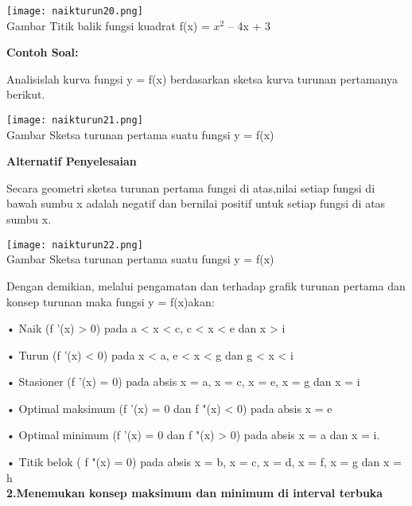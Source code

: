 \documentclass[11pt,fleqn]{book} %
\begin{document}
\begin{center}
\texttt{[image: naikturun20.png]}\\
Gambar Titik balik fungsi kuadrat f(x) = $x^{2}$ – 4x + 3
\end{center}

\begin{flushleft}
\textbf{Contoh Soal:}

Analisislah kurva fungsi y = f(x) berdasarkan sketsa kurva
turunan pertamanya berikut.
\end{flushleft}

\begin{center}
\texttt{[image: naikturun21.png]}\\
Gambar Sketsa turunan pertama suatu fungsi y = f(x)
\end{center}

\begin{flushleft}
\textbf{Alternatif Penyelesaian}

Secara geometri sketsa turunan pertama fungsi di atas,nilai setiap fungsi di bawah sumbu x adalah negatif dan bernilai positif untuk setiap fungsi di atas sumbu x.
\end{flushleft}

\begin{center}
\texttt{[image: naikturun22.png]}\\
Gambar Sketsa turunan pertama suatu fungsi y = f(x)
\end{center}

\begin{flushleft}
Dengan demikian, melalui pengamatan dan terhadap grafik turunan pertama dan konsep turunan maka fungsi y = f(x)akan:
\end{flushleft}

• Naik (f '(x) > 0) pada a < x < c, c < x < e dan x > i

• Turun (f '(x) < 0) pada x < a, e < x < g dan g < x < i

• Stasioner (f '(x) = 0) pada absis x = a, x = c, x = e, x = g dan x = i

• Optimal maksimum (f '(x) = 0 dan f "(x) < 0) pada absis x = e

• Optimal minimum (f '(x) = 0 dan f "(x) > 0) pada absis x = a dan x = i.

• Titik belok ( f "(x) = 0) pada absis x = b, x = c, x = d, x = f, x = g dan x = h\\

\textbf{2.Menemukan konsep maksimum dan minimum di interval terbuka}
\end{document}
